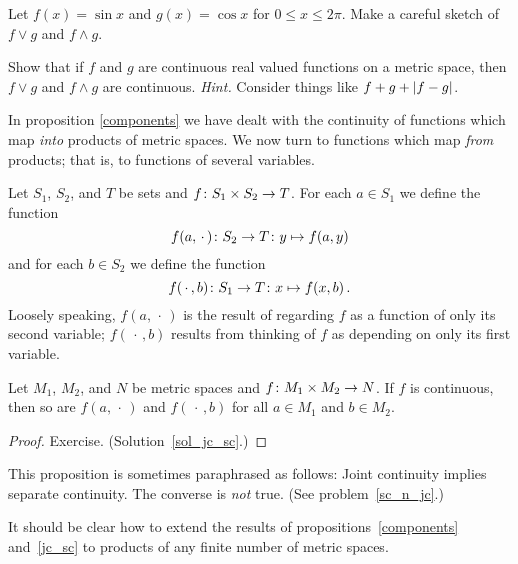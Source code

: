 \begin{prob} Let $f(x)= \sin x$ and $g(x) = \cos x$ for $0 \le x \le 2\pi$.  Make a careful
sketch of $f \lor g$ and $f \land g$.
\end{prob}

\begin{prob}\label{prob_cont_sup}  Show that if $f$ and $g$ are continuous real valued functions
on a metric space, then $f \lor g$ and $f \land g$ are continuous.  \emph{Hint.} Consider
things like $f + g + \lvert f - g\rvert$.
\end{prob}

In proposition \ref{components} we have dealt with the continuity of functions which map
\emph{into} products of metric spaces.  We now turn to functions which map \emph{from}
products; that is, to functions of several variables.

\begin{notn} Let $S_1$, $S_2$, and $T$ be sets and $f\colon S_1 \times S_2 \rightarrow T$.  For each
$a \in S_1$ we define the function
  \[f(a,\,\cdot\,)\colon S_2 \rightarrow T\colon y \mapsto f(a,y)\]
and for each $b \in S_2$ we define the function
  \[f(\,\cdot\,,b)\colon S_1 \rightarrow T\colon  x \mapsto f(x,b)\,.\]
Loosely speaking, $f(a,\,\cdot\,)$ is the result of regarding $f$ as a function of only its
second variable; $f(\,\cdot\,,b)$ results from thinking of $f$ as depending on only its first
variable.
\end{notn}

\begin{prop}\label{jc_sc} Let $M_1$, $M_2$, and $N$ be metric spaces and $f\colon M_1 \times
M_2 \rightarrow N$.  If $f$ is continuous, then so are $f(a,\,\cdot\,)$ and $f(\,\cdot\,,b)$ for all $a
\in M_1$ and $b \in M_2$.
\end{prop}

\begin{proof} Exercise.   (Solution~\ref{sol_jc_sc}.)  \ns  \end{proof}

This proposition is sometimes paraphrased as follows: Joint continuity implies separate continuity.
The converse is \emph{not} true. (See problem~\ref{sc_n_jc}.)

\begin{rem} It should be clear how to extend the results of
propositions~\ref{components} and~\ref{jc_sc} to products of any finite number of metric spaces.
\end{rem}

